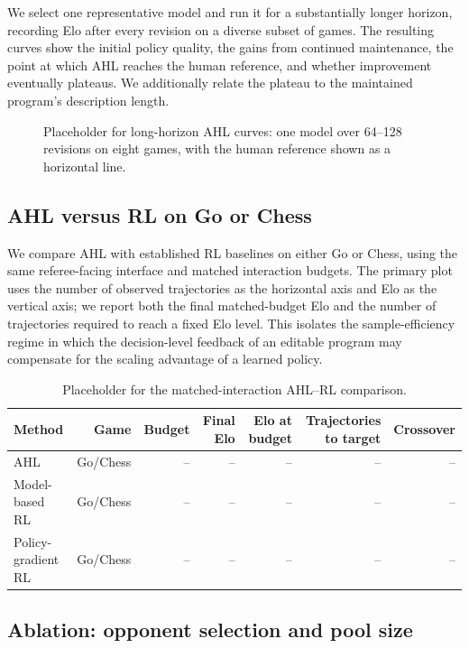 We select one representative model and run it for a substantially longer horizon,
recording Elo after every revision on a diverse subset of games. The resulting curves
show the initial policy quality, the gains from continued maintenance, the point at
which AHL reaches the human reference, and whether improvement eventually plateaus.
We additionally relate the plateau to the maintained program's description length.

\begin{figure}[t]
\centering
\fbox{\rule{0pt}{4.2cm}\rule{0.92\linewidth}{0pt}}
\caption{Placeholder for long-horizon AHL curves: one model over 64--128 revisions
on eight games, with the human reference shown as a horizontal line.}
\label{fig:long-horizon}
\end{figure}

\subsection{AHL versus RL on Go or Chess}
\label{sec:exp-rl}

We compare AHL with established RL baselines on either Go or Chess, using the same
referee-facing interface and matched interaction budgets. The primary plot uses the
number of observed trajectories as the horizontal axis and Elo as the vertical axis;
we report both the final matched-budget Elo and the number of trajectories required to
reach a fixed Elo level. This isolates the sample-efficiency regime in which the
decision-level feedback of an editable program may compensate for the scaling
advantage of a learned policy.

\begin{table}[t]
\centering\scriptsize
\begin{tabular}{lrrrrrr}
\toprule
Method & Game & Budget & Final Elo & Elo at budget & Trajectories to target & Crossover \\
\midrule
AHL & Go/Chess & -- & -- & -- & -- & -- \\
Model-based RL & Go/Chess & -- & -- & -- & -- & -- \\
Policy-gradient RL & Go/Chess & -- & -- & -- & -- & -- \\
\bottomrule
\end{tabular}
\caption{Placeholder for the matched-interaction AHL--RL comparison.}
\label{tab:rl-results}
\end{table}

\subsection{Ablation: opponent selection and pool size}
\label{sec:exp-opponent-ablation}

